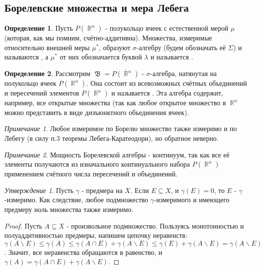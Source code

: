 \documentclass[a4paper]{article}
\theoremstyle{indented}
\theoremstyle{definition}
\newtheorem{defn}{Определение}
\theoremstyle{remark}
\newtheorem{remark}{Примечание}
\newtheorem{stat}{Утверждение}
\DeclareMathOperator{\RR}{\mathbb{R}}
\DeclareMathOperator{\GB}{\mathfrak{B}}
\begin{document}
\subsection{Борелевские множества и мера Лебега}
\begin{defn}
Пусть $P(\RR^n)$ - полукольцо ячеек с естественной мерой $\mu$ (которая, как мы помним, счётно-аддитивна). Множества, измеримые относительно внешней меры $\mu^*$, образуют $\sigma$-алгебру (будем обозначать её $\Sigma$) и называются , а $\mu^*$ от них обозначается буквой $\lambda$ и называется . 
\end{defn}
\begin{defn}
Рассмотрим $\GB = \overline{P(\RR^n)}$ - $\sigma$-алгебра, натянутая на полукольцо ячеек $P(\RR^n)$. Она состоит из всевозможных счётных объединений и пересечений элементов $P(\RR^n)$ и называется . Эта алгебра содержит, например, все открытые множества (так как любое открытое множество в $\RR^n$ можно представить в виде дизъюнктного объединения ячеек).
\end{defn}
\begin{remark}
Любое измеримое по Борелю множество также измеримо и по Лебегу (в силу п.3 теоремы Лебега-Каратеодори), но обратное неверно. 
\end{remark}
\begin{remark}
Мощность Борелевской алгебры - континуум, так как все её элементы получаются из изначального континуального набора $P(\RR^n)$ применением счётного числа пересечений и объединений.
\end{remark}
\begin{stat}
Пусть $\gamma$ - предмера на $X$. Если $E \subseteq X$, и $\gamma(E)=0$, то $E$ - $\gamma$-измеримо. Как следствие, любое подмножество $\gamma$-измеримого и имеющего предмеру ноль множества также измеримо.
\end{stat}
\begin{proof}
Пусть $A \subseteq X$ - произвольное подмножество. Пользуясь монотонностью и полуаддитивностью предмеры, напишем цепочку неравенств: $\gamma(A \backslash E) \leq \gamma(A) \leq \gamma(A \cap E)+ \gamma(A \backslash E) \leq \gamma(E)+\gamma(A \backslash E) = \gamma(A \backslash E)$. Значит, все неравенства обращаются в равенство, и $\gamma(A)= \gamma(A \cap E)+ \gamma(A \backslash E)$.
\end{proof}
\end{document}
